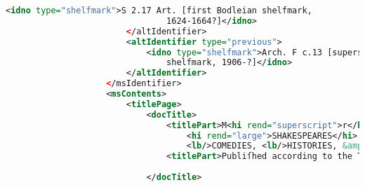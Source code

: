 \documentclass[class=article, crop=false]{standalone}
\begin{document}
\begin{lstlisting}[language=XML]
                            <idno type="shelfmark">S 2.17 Art. [first Bodleian shelfmark,
                                1624-1664?]</idno>
                        </altIdentifier>
                        <altIdentifier type="previous">
                            <idno type="shelfmark">Arch. F c.13 [superscript z?] [second Bodleian
                                shelfmark, 1906-?]</idno>
                        </altIdentifier>
                    </msIdentifier>
                    <msContents>
                        <titlePage>
                            <docTitle>
                                <titlePart>M<hi rend="superscript">r</hi> VVILLIAM <lb/>
                                    <hi rend="large">SHAKESPEARES</hi>
                                    <lb/>COMEDIES, <lb/>HISTORIES, &amp; <lb/>TRAGEDIES. </titlePart>
                                <titlePart>Publiſhed according to the True Originall Copies.</titlePart>
                                
                            </docTitle>
                            

\end{lstlisting}
\end{document}
